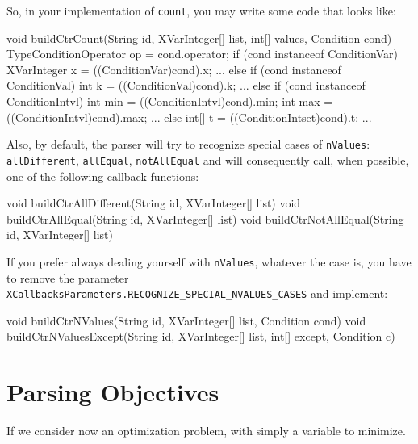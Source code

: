 \documentclass[10pt]{article}
\newenvironment{boxabsc}
               {\medskip \begin{bclogo}[barre=none,arrondi=0.2,logo=]{}\vspace{-0.6cm}}
               {\vspace{-0.1cm}\end{bclogo} \smallskip}
\newcommand{\gb}[1]{{\tt #1}} %
\begin{document}
So, in your implementation of \gb{count}, you may write some code that looks like:
\begin{boxabsc}
\begin{absc}
void buildCtrCount(String id, XVarInteger[] list, int[] values, Condition cond) {
  TypeConditionOperator op = cond.operator; 
  if (cond instanceof ConditionVar) {
    XVarInteger x = ((ConditionVar)cond).x;
    ...
  } else if (cond instanceof ConditionVal) {
    int k = ((ConditionVal)cond).k;
    ...
  } else if (cond instanceof ConditionIntvl) {
    int min = ((ConditionIntvl)cond).min;
    int max = ((ConditionIntvl)cond).max;
    ...
  } else {
    int[] t = ((ConditionIntset)cond).t;
    ...
  }
}
\end{absc} 
\end{boxabsc}

Also, by default, the parser will try to recognize special cases of \gb{nValues}: \gb{allDifferent}, \gb{allEqual}, \gb{notAllEqual} and will consequently call, when possible, one of the following callback functions:
\begin{boxabsc}
\begin{absc}
void buildCtrAllDifferent(String id, XVarInteger[] list)
void buildCtrAllEqual(String id, XVarInteger[] list)
void buildCtrNotAllEqual(String id, XVarInteger[] list)
\end{absc} 
\end{boxabsc}

If you prefer always dealing yourself with \gb{nValues}, whatever the case is, you have to remove the parameter \verb!XCallbacksParameters.RECOGNIZE_SPECIAL_NVALUES_CASES! and implement:
\begin{boxabsc}
\begin{absc}
void buildCtrNValues(String id, XVarInteger[] list, Condition cond)
void buildCtrNValuesExcept(String id, XVarInteger[] list, int[] except, Condition c)
\end{absc} 
\end{boxabsc}


\section{Parsing Objectives}


If we consider now an optimization problem, with simply a variable to minimize.
\end{document}
